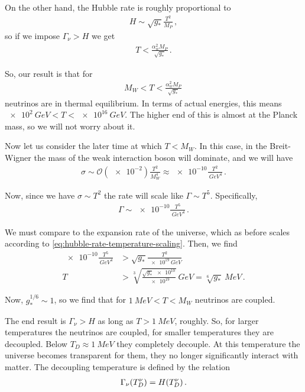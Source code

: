 \documentclass[main.tex]{subfiles}
\begin{document}
On the other hand, the Hubble rate is roughly proportional to 
%
\begin{align} \label{eq:hubble-rate-temperature-scaling}
H \sim \sqrt{g_{*}} \frac{T^2}{M_P}
\,,
\end{align}
%
so if we impose \(\Gamma_{\nu } > H\) we get  
%
\begin{align}
T < \frac{\alpha^2_{w} M_{P}}{\sqrt{g_{*}}}
\,.
\end{align}

So, our result is that for 
%
\begin{align}
M_W < T < \frac{\alpha^2_{w} M_P}{\sqrt{g_{*}}}
\,
\end{align}
%
neutrinos are in thermal equilibrium.
In terms of actual energies, this means \(\SI{e2}{GeV} < T < \SI{e16}{GeV}\). The higher end of this is almost at the Planck mass, so we will not worry about it.

Now let us consider the later time at which \(T < M_W\). In this case, in the Breit-Wigner the mass of the weak interaction boson will dominate, and we will have 
%
\begin{align}
\sigma \sim \mathcal{O}(\num{e-2}) \frac{T^2}{M_W^4} \approx \num{e-10} \frac{T^2}{\SI{}{GeV}^{4}}
\,.
\end{align}

Now, since we have \(\sigma \sim T^{2}\) the rate will scale like \(\Gamma \sim T^{5}\). Specifically, 
%
\begin{align}
\Gamma \sim \num{e-10} \frac{T^{5}}{\SI{}{GeV^{4}}}
\,.
\end{align}

We must compare to the expansion rate of the universe, which as before scales according to \ref{eq:hubble-rate-temperature-scaling}. Then, we find 
%
\begin{align}
\num{e-10} \frac{T^{5}}{\SI{}{GeV^{4}}} &> \sqrt{g_{*}} \frac{T^2}{\SI{e19}{GeV}}  \\
T &> \sqrt[3]{\frac{\sqrt{g_{*}} \num{e10}}{\num{e19}}} \SI{}{GeV} 
= \sqrt[6]{g_{*}} \SI{}{MeV}
\,.
\end{align}

Now, \(g_{*}^{1/6} \sim 1\), so we find that for \(\SI{1}{MeV} < T < M_W\) neutrinos are coupled. 

The end result is \(\Gamma_{\nu } > H\) as long as \(T > \SI{1}{MeV}\), roughly.
So, for larger temperatures the neutrinos are coupled, for smaller temperatures they are decoupled. Below \(T_D \approx\SI{1}{MeV}\) they completely decouple. 
At this temperature the universe becomes transparent for them, they no longer significantly interact with matter.
The decoupling temperature is defined by the relation 
%
\begin{align}
\Gamma_{\nu } \qty(T^{\nu }_{D}) = H(T^{\nu }_{D})
\,.
\end{align}
\end{document}
